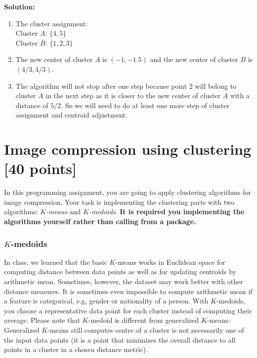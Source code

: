 \documentclass[twoside,10pt]{article}
\begin{document}
\begin{enumerate}
\begin{tcolorbox}
\textbf{Solution:}
\begin{enumerate}
\item The cluster assignment:\\
Cluster $A$: $\{4,5\}$\\
Cluster $B$: $\{1,2,3\}$\\
\item The new center of cluster $A$ is $(-1,-1.5)$ and the new center of cluster $B$ is $(4/3,4/3)$.
\item The algorithm will not stop after one step because point 2 will belong to cluster $A$ in the next step as it is closer to the new center of cluster $A$ with a distance of $5/2$. So we will need to do at least one more step of cluster assignment and centroid adjustment.
\end{enumerate}

\end{tcolorbox}


\end{enumerate}


\section{Image compression using clustering [40 points]}

In this programming assignment, you are going to apply clustering algorithms for image compression. Your task is implementing the clustering parts with two algorithms: \emph{$K$-means} and \emph{$K$-medoids}.  {\bf It is required you implementing the algorithms yourself rather than calling from a package.} %

\subsubsection*{$K$-medoids}

In class, we learned that the basic $K$-means works in Euclidean space for computing distance between data points as well as for updating centroids by arithmetic mean. Sometimes, however, the dataset may work better with other distance measures. It is sometimes even impossible to compute arithmetic mean if a feature is categorical, e.g, gender or nationality of a person. With $K$-medoids, you choose a representative data point for each cluster instead of computing their average. Please note that $K$-medoid is different from generalized $K$-means: Generalized $K$-means still computes centre of a cluster is not necessarily one of the input data points (it is a point that minimizes the overall distance to all points in a cluster in a chosen distance metric). 
\end{document}
